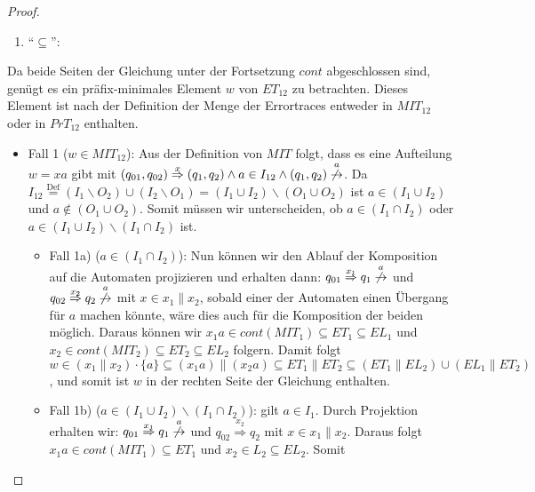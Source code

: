 \begin{proof}
  ~
  \begin{enumerate}
    \item ``$\subseteq$'':
  \end{enumerate}
  Da beide Seiten der Gleichung unter der Fortsetzung $cont$ abgeschlossen sind, genügt es ein
  präfix-minimales Element $w$ von $ET_{12}$ zu betrachten. Dieses Element ist
  nach der Definition der Menge der Errortraces entweder in $MIT_{12}$ oder in
  $PrT_{12}$ enthalten.\\
  \begin{itemize}
    \item Fall 1 ($w\in MIT_{12}$): Aus der Definition von $MIT$ folgt, dass es eine
  Aufteilung $w=xa$ gibt mit
  $(q_{01},q_{02})\overset{x}{\Rightarrow}(q_1,q_2)\wedge a\in I_{12}\wedge
  (q_1,q_2)\overset{a}{\not{\hspace{-0.1cm}\rightarrow}}$. Da
  $I_{12}\overset{\mathrm{Def}}{=}(I_1\backslash O_2)\cup (I_2\backslash O_1)=(I_1\cup
  I_2)\backslash (O_1\cup O_2)$ ist $a\in (I_1\cup I_2)$ und $a\notin (O_1\cup
  O_2)$. Somit müssen wir unterscheiden, ob $a\in (I_1\cap I_2)$ oder $a\in
  (I_1\cup I_2)\backslash (I_1\cap I_2)$ ist.
  \begin{itemize}
    \item Fall 1a) ($a\in (I_1\cap I_2)$): Nun können wir den Ablauf der Komposition
  auf die Automaten projizieren und erhalten dann:
  $q_{01}\overset{x_1}{\Rightarrow} q_1
  \overset{a}{\not{\hspace{-0.1cm}\rightarrow}}$ und
  $q_{02}\overset{x_2}{\Rightarrow} q_2
  \overset{a}{\not{\hspace{-0.1cm}\rightarrow}}$ mit $x\in x_1\|x_2$, sobald einer der Automaten
  einen Übergang für $a$ machen könnte, wäre dies auch für die Komposition der
  beiden möglich. Daraus können wir $x_1a\in cont(MIT_1)\subseteq ET_1\subseteq
  EL_1$ und $x_2\in cont(MIT_2)\subseteq ET_2\subseteq EL_2$ folgern.
  Damit folgt $w\in (x_1\|x_2)\cdot\{a\}\subseteq (x_1a)\|(x_2a)\subseteq
  ET_1\|ET_2\subseteq (ET_1\|EL_2)\cup(EL_1\|ET_2)$, und somit ist $w$ in der
  rechten Seite der Gleichung enthalten.
\item Fall 1b) ($a\in (I_1\cup I_2)\backslash(I_1\cap I_2)$): \OBdA{} gilt
      $a\in I_1$. Durch Projektion erhalten wir:
      $q_{01}\overset{x_1}{\Rightarrow} q_1
      \overset{a}{\not{\hspace{-0.1cm}\rightarrow}}$ und
      $q_{02}\overset{x_2}{\Rightarrow} q_2$ mit $x\in x_1\|x_2$. Daraus folgt
      $x_1a\in cont(MIT_1)\subseteq ET_1$ und $x_2\in L_2\subseteq EL_2$. Somit

\end{itemize}
\end{itemize}
\end{proof}

